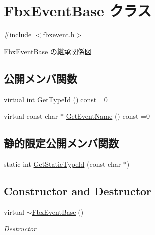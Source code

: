 \hypertarget{class_fbx_event_base}{}\section{Fbx\+Event\+Base クラス}
\label{class_fbx_event_base}


{\ttfamily \#include $<$fbxevent.\+h$>$}



Fbx\+Event\+Base の継承関係図
\subsection*{公開メンバ関数}
\begin{DoxyCompactItemize}
\item 
virtual int \hyperlink{class_fbx_event_base_ac7a558ec38bc899bd705786620582b8b}{Get\+Type\+Id} () const =0
\item 
virtual const char $\ast$ \hyperlink{class_fbx_event_base_a94c1acf878d522042b327abf0c129f10}{Get\+Event\+Name} () const =0
\end{DoxyCompactItemize}
\subsection*{静的限定公開メンバ関数}
\begin{DoxyCompactItemize}
\item 
static int \hyperlink{class_fbx_event_base_a57cde15f6d1c6567bc8dbafc1658bcc5}{Get\+Static\+Type\+Id} (const char $\ast$)
\end{DoxyCompactItemize}
\subsection*{Constructor and Destructor}
\begin{DoxyCompactItemize}
\item 
virtual \hyperlink{class_fbx_event_base_aa95657834201b514cb515cf60d371938}{$\sim$\+Fbx\+Event\+Base} ()
\begin{DoxyCompactList}\small\item\em Destructor \end{DoxyCompactList}\end{DoxyCompactItemize}



